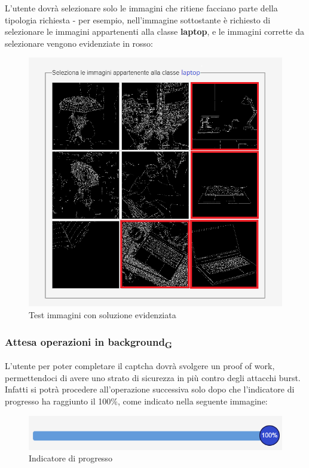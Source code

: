 \newpage
 
L'utente dovrà selezionare solo le immagini che ritiene facciano parte della tipologia richiesta - per esempio, nell'immagine sottostante è richiesto di selezionare le immagini appartenenti alla classe \textbf{laptop}, e le immagini corrette da selezionare vengono evidenziate in rosso:

\begin{figure}[H]
    \centering
    \includegraphics[scale=0.6]{img/captchaimgselezionato.png}
    \caption{Test immagini con soluzione evidenziata}
\end{figure}

\subsubsection{Attesa operazioni in background\textsubscript{G}}
L'utente per poter completare il captcha dovrà svolgere un proof of work, permettendoci di avere uno strato di sicurezza in più contro degli attacchi burst. Infatti si potrà procedere all'operazione successiva solo dopo che l'indicatore di progresso ha raggiunto il 100\%, come indicato nella seguente immagine:
\begin{figure}[H]
    \centering
    \includegraphics[scale=0.8]{img/barra.png}
    \caption{Indicatore di progresso}
\end{figure} 

